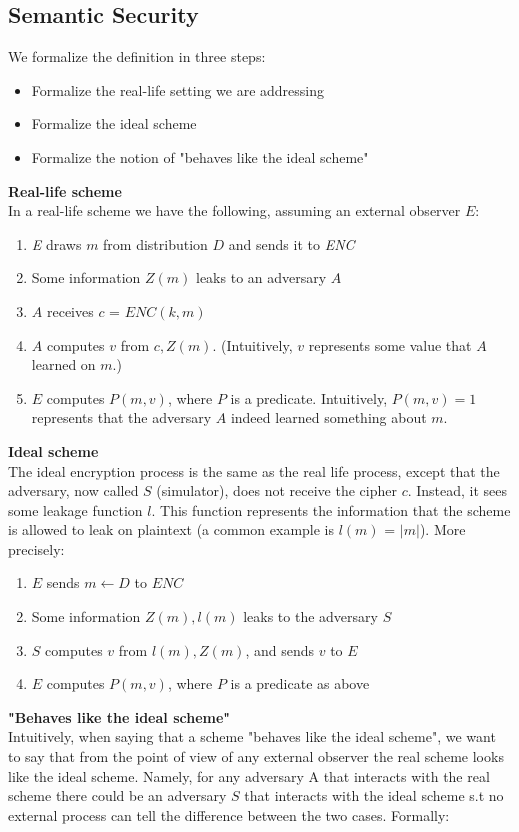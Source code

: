 \documentclass[12pt]{article}
\begin{document}
\subsection{Semantic Security}
We formalize the definition in three steps:
\begin{itemize}
\item Formalize the real-life setting we are addressing
\item Formalize the ideal scheme
\item Formalize the notion of "behaves like the ideal scheme"
\end{itemize}
\textbf{Real-life scheme}\\
In a real-life scheme we have the following, assuming an external observer $E$:
\begin{enumerate}
\item \textit{E} draws $m$ from distribution $D$ and sends it to \textit{ENC}
\item Some information $Z(m)$ leaks to an adversary $A$
\item $A$ receives $c$ = $ENC(k,m)$
\item $A$ computes $v$ from $c,Z(m)$. (Intuitively, $v$ represents some value that $A$ learned on $m$.)
\item $E$ computes $P(m, v)$, where $P$ is a predicate. Intuitively, $P(m, v) = 1$ represents that the adversary $A$ indeed learned something about $m$.
\end{enumerate}
\textbf{Ideal scheme}\\
The ideal encryption process is the same as the real life process, except that the adversary, now called $S$ (simulator), does not receive the cipher $c$. Instead, it sees some leakage function $l$. This function represents the information that the scheme is allowed to leak on plaintext (a common example is $l(m)$ = $|m|$). More precisely:
\begin{enumerate}
\item $E$ sends $m \leftarrow D$ to $ENC$
\item Some information $Z(m),l(m)$ leaks to the adversary $S$
\item $S$ computes $v$ from $l(m),Z(m)$, and sends $v$ to $E$
\item $E$ computes $P(m, v)$, where $P$ is a predicate as above
\end{enumerate}
\textbf{"Behaves like the ideal scheme"}\\
Intuitively, when saying that a scheme "behaves like the ideal scheme", we want to say that from the point of view of any external observer the real scheme looks like the ideal scheme. Namely, for any adversary A that interacts with the real scheme there could be an adversary $S$ that interacts with the ideal scheme s.t no external process can tell the difference between the two cases. Formally:
\end{document}
